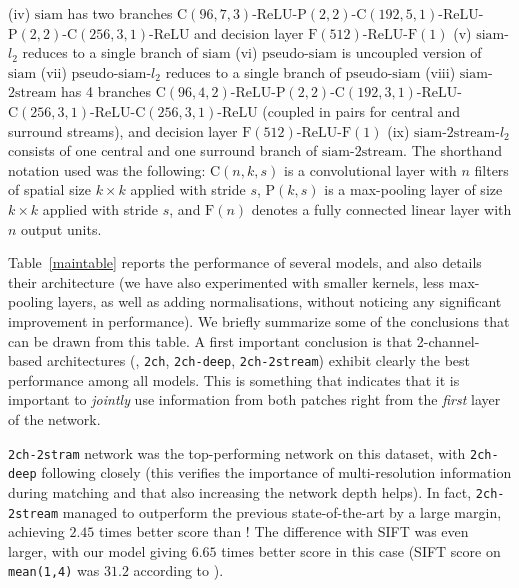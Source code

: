 \documentclass[10pt,twocolumn,letterpaper]{article}
\begin{document}
\begin{table*}[t]
{(iv) $\mathrm{siam}$ has two branches $\mathrm{C}(96,7,3)$-$\mathrm{ReLU}$-$\mathrm{P}(2,2)$-$\mathrm{C}(192,5,1)$-$\mathrm{ReLU}$-$\mathrm{P}(2,2)$-$\mathrm{C}(256,3,1)$-$\mathrm{ReLU}$ and decision layer $\mathrm{F}(512)$-$\mathrm{ReLU}$-$\mathrm{F}(1)$
(v) $\mathrm{siam}$-$l_2$ reduces to a single branch of $\mathrm{siam}$ 
(vi) $\mathrm{pseudo}$-$\mathrm{siam}$ is uncoupled version of $\mathrm{siam}$
(vii) $\mathrm{pseudo}$-$\mathrm{siam}$-$l_2$ reduces to a single branch of $\mathrm{pseudo}$-$\mathrm{siam}$ 
(viii) $\mathrm{siam}$-$\mathrm{2stream}$ has 4 branches $\mathrm{C}(96,4,2)$-$\mathrm{ReLU}$-$\mathrm{P}(2,2)$-$\mathrm{C}(192,3,1)$-$\mathrm{ReLU}$-$\mathrm{C}(256,3,1)$-$\mathrm{ReLU}$-$\mathrm{C}(256,3,1)$-$\mathrm{ReLU}$ (coupled in pairs for central and surround streams), and decision layer $\mathrm{F}(512)$-$\mathrm{ReLU}$-$\mathrm{F}(1)$
(ix) $\mathrm{siam}$-$\mathrm{2stream}$-$l_2$ consists of one central and one surround branch of $\mathrm{siam}$-$\mathrm{2stream}$. 
 The shorthand notation used was the following: $\mathrm{C}(n,k,s)$ is a convolutional layer with $n$ filters of spatial size $k\times k$ applied with stride $s$, $\mathrm{P}(k,s)$ is a max-pooling layer of size $k\times k$ applied with stride $s$, and $\mathrm{F}(n)$ denotes a fully connected linear layer with $n$ output units.}
\label{maintable}
\end{table*}




%
%
%
%

Table~\ref{maintable} reports the performance of several models, and also details their architecture (we  have also experimented with smaller kernels, less max-pooling layers, as well as adding normalisations, without noticing any significant improvement in performance).
We briefly summarize some of the conclusions that can be drawn from this table. A first important conclusion  is that 
  2-channel-based architectures (\eg, \texttt{2ch}, \texttt{2ch-deep}, \texttt{2ch-2stream})   exhibit clearly the best performance among all models. This  is something that indicates that  it is important to \emph{jointly} use information from both patches {right from the \emph{first} layer} of the network. 

%

\texttt{2ch-2stram} network  was the top-performing network on this dataset, with  \texttt{2ch-deep} following closely (this verifies the importance of multi-resolution information during matching and that also increasing the network depth helps). In fact,  \texttt{2ch-2stream} managed  to outperform the previous state-of-the-art  by a large margin, achieving $2.45$ times better score than    \cite{Simonyan14}! The difference with   SIFT was even larger, with our model giving  $6.65$ times better score in this case (SIFT score  on \texttt{mean(1,4)} was $31.2$ according to \cite{BHW10}).
\end{document}
